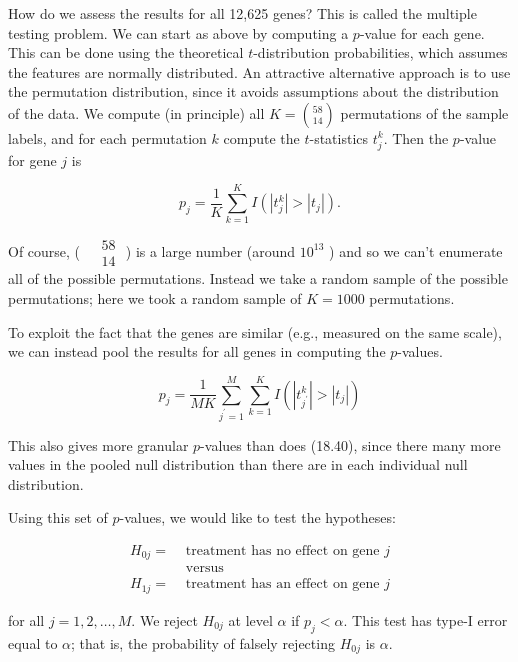 \documentclass[10pt]{article}
\begin{document}
How do we assess the results for all 12,625 genes? This is called the multiple testing problem. We can start as above by computing a $p$-value for each gene. This can be done using the theoretical $t$-distribution probabilities, which assumes the features are normally distributed. An attractive alternative approach is to use the permutation distribution, since it avoids assumptions about the distribution of the data. We compute (in principle) all $K=\binom{58}{14}$ permutations of the sample labels, and for each permutation $k$ compute the $t$-statistics $t_{j}^{k}$. Then the $p$-value for gene $j$ is


\begin{equation*}
p_{j}=\frac{1}{K} \sum_{k=1}^{K} I\left(\left|t_{j}^{k}\right|>\left|t_{j}\right|\right) . \tag{18.40}
\end{equation*}


Of course, ( $\begin{aligned} & 58 \\ & 14\end{aligned}$ ) is a large number (around $10^{13}$ ) and so we can't enumerate all of the possible permutations. Instead we take a random sample of the possible permutations; here we took a random sample of $K=1000$ permutations.

To exploit the fact that the genes are similar (e.g., measured on the same scale), we can instead pool the results for all genes in computing the $p$-values.


\begin{equation*}
p_{j}=\frac{1}{M K} \sum_{j^{\prime}=1}^{M} \sum_{k=1}^{K} I\left(\left|t_{j^{\prime}}^{k}\right|>\left|t_{j}\right|\right) \tag{18.41}
\end{equation*}


This also gives more granular $p$-values than does (18.40), since there many more values in the pooled null distribution than there are in each individual null distribution.

Using this set of $p$-values, we would like to test the hypotheses:


\begin{align*}
H_{0 j}= & \text { treatment has no effect on gene } j \\
& \text { versus }  \tag{18.42}\\
H_{1 j}= & \text { treatment has an effect on gene } j
\end{align*}


for all $j=1,2, \ldots, M$. We reject $H_{0 j}$ at level $\alpha$ if $p_{j}<\alpha$. This test has type-I error equal to $\alpha$; that is, the probability of falsely rejecting $H_{0 j}$ is $\alpha$.
\end{document}
